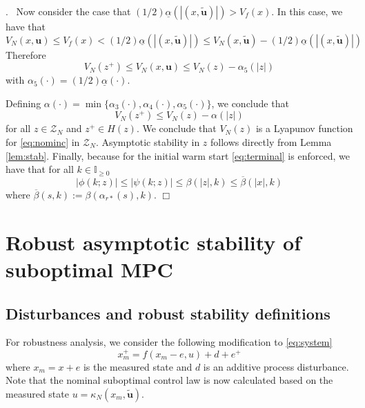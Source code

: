 \documentclass{article}
\newenvironment{proof}{\noindent {\em Proof}.\ }{\hspace*{\fill}$\Box$\medskip\\}
\newcommand{\abs}[1]{\left\lvert #1 \right\rvert}
\begin{document}
\begin{proof}
Now consider the case that $(1/2)\underline{\alpha}
(\abs{(x,\tilde{\mathbf{u}})}) > V_f(x)$. In this case, we have that
\begin{equation*}
V_N(x,\mathbf{u}) \leq V_f(x) < (1/2)\underline{\alpha}(\abs{(x,\tilde{\mathbf{u}})})
\leq V_N(x,\tilde{\mathbf{u}}) - (1/2)\underline{\alpha}(\abs{(x,\tilde{\mathbf{u}})})
\end{equation*}
Therefore
\begin{equation*}
V_N(z^+) \leq V_N(x,\mathbf{u}) \leq V_N(z) - \alpha_5(\abs{z})
\end{equation*}
with $\alpha_5(\cdot) = (1/2)\underline{\alpha}(\cdot)$.

Defining $\alpha(\cdot) = \min\{\alpha_3(\cdot),\alpha_4(\cdot),\alpha_5(\cdot)\}$, we conclude 
that
\begin{equation*}
V_N(z^+) \leq V_N(z) - \alpha(\abs{z})
\end{equation*}
for all $z \in \mathcal{Z}_N$ and $z^+ \in H(z)$. 
We conclude that $V_N(z)$ is a Lyapunov function for 
\eqref{eq:nominc} in $\mathcal{Z}_N$. Asymptotic stability in $z$ follows directly from Lemma \ref{lem:stab}.
Finally, because for the initial warm start \eqref{eq:terminal} is enforced, we have that 
for all $k \in \mathbb{I}_{\geq 0}$
\begin{equation*}
\abs{\phi(k;z)} \leq \abs{\psi(k;z)} \leq \beta(\abs{z},k) \leq \overline{\beta}(\abs{x},k)
\end{equation*}
where $\overline{\beta}(s,k) := \beta(\alpha_{r*}(s),k)$.
\end{proof}

\section{Robust asymptotic stability of suboptimal MPC}
\subsection{Disturbances and robust stability definitions}
For robustness analysis, we consider the following modification to \eqref{eq:system}
\begin{equation}
\label{eq:disturbed}
x_m^+ = f(x_m-e,u) + d + e^+
\end{equation}
where $x_m = x+e$ is the measured state and $d$ is an additive process disturbance.
Note that the nominal suboptimal control 
law is now calculated based on the measured state $u = \kappa_N(x_m,\tilde{\mathbf{u}})$.
\end{document}
